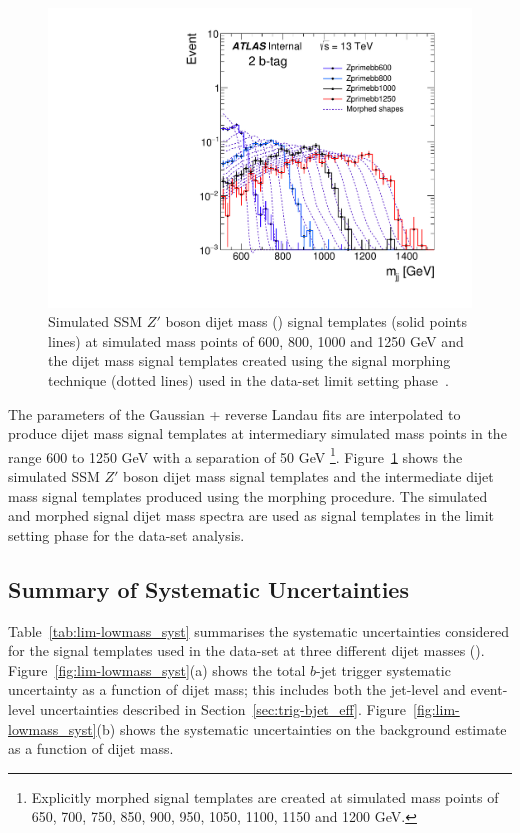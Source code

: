 \begin{figure}[!b]
  \vspace{-1.2em}
\begin{center}
  \includegraphics[width=0.47\linewidth, angle=0]{figs/Dibjet/LowMass/lim-morphing.pdf} 
\end{center}
\vspace{-2em}
\caption[Simulated SSM $Z'$ boson dijet mass signal templates and the intermediate dijet mass signal templates
  created using the signal morphing technique used in the \lm{} data-set limit setting phase.]
        {Simulated SSM $Z'$ boson dijet mass (\mjj) signal templates (solid points lines)
          at simulated mass points of 600, 800, 1000 and 1250 GeV 
          and the dijet mass signal templates created using the signal morphing technique (dotted lines) used in the \lm{} data-set limit setting phase~\cite{dibjet-full_int}.
          \label{fig:lim-full_morphing}}
\end{figure}

The parameters of the Gaussian + reverse Landau fits are interpolated to produce dijet mass signal templates at intermediary simulated mass points
in the range 600 to 1250 GeV with a separation of 50 GeV \footnote{Explicitly morphed signal templates are created at simulated mass points of 650, 700, 750, 850, 900, 950, 1050, 1100, 1150 and 1200 GeV.}.
Figure~\ref{fig:lim-full_morphing} shows the simulated SSM $Z'$ boson dijet mass signal templates and the intermediate dijet mass signal templates produced using the morphing procedure.
The simulated and morphed signal dijet mass spectra are used as signal templates in the limit setting phase for the \lm{} data-set analysis.


\subsection{Summary of Systematic Uncertainties}
\label{sec:lim-full_systs}

Table~\ref{tab:lim-lowmass_syst} summarises the systematic uncertainties considered for the
signal templates used in the \lm{} data-set at three different dijet masses (\mjj{}).
Figure~\ref{fig:lim-lowmass_syst}(a) shows the total $b$-jet trigger systematic uncertainty as a function of dijet  mass;
this includes both the jet-level and event-level uncertainties described in Section~\ref{sec:trig-bjet_eff}.
Figure~\ref{fig:lim-lowmass_syst}(b) shows the systematic uncertainties on the background estimate as a function of dijet  mass.

